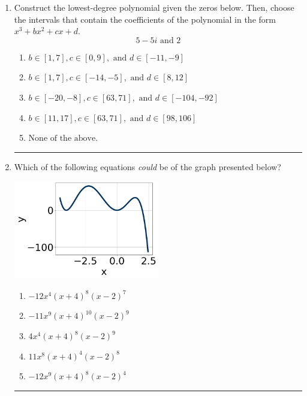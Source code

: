 \documentclass[14pt]{extbook}
\newcommand{\litem}[1]{\item#1\hspace*{-1cm}\rule{\textwidth}{0.4pt}}
\begin{document}
\begin{enumerate}
\litem{
Construct the lowest-degree polynomial given the zeros below. Then, choose the intervals that contain the coefficients of the polynomial in the form $x^3+bx^2+cx+d$.\[ 5 - 5 i \text{ and } 2 \]\begin{enumerate}[label=\Alph*.]
\item \( b \in [1, 7], c \in [0, 9], \text{ and } d \in [-11, -9] \)
\item \( b \in [1, 7], c \in [-14, -5], \text{ and } d \in [8, 12] \)
\item \( b \in [-20, -8], c \in [63, 71], \text{ and } d \in [-104, -92] \)
\item \( b \in [11, 17], c \in [63, 71], \text{ and } d \in [98, 106] \)
\item \( \text{None of the above.} \)

\end{enumerate} }
\litem{
Which of the following equations \textit{could} be of the graph presented below?
\begin{center}
    \includegraphics[width=0.5\textwidth]{../Figures/polyGraphToFunctionCopyB.png}
\end{center}
\begin{enumerate}[label=\Alph*.]
\item \( -12x^{4} (x + 4)^{8} (x - 2)^{7} \)
\item \( -11x^{9} (x + 4)^{10} (x - 2)^{9} \)
\item \( 4x^{4} (x + 4)^{8} (x - 2)^{9} \)
\item \( 11x^{8} (x + 4)^{4} (x - 2)^{8} \)
\item \( -12x^{9} (x + 4)^{8} (x - 2)^{4} \)


\end{enumerate}}
\end{enumerate}
\end{document}
